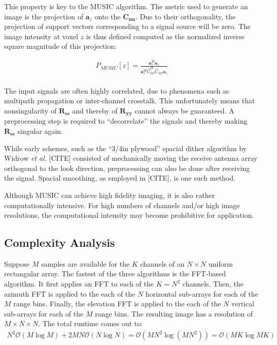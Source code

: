 This property is key to the MUSIC algorithm.
The metric used to generate an image is the projection of $\mathbf a_z$ onto the $\mathbf{C_{nn}}$.
Due to their orthogonality, the projection of support vectors corresponding to a signal source will be zero.
The image intensity at voxel $z$ is thus defined computed as the normalized inverse square magnitude of this projection:

\begin{align}
    P_{MUSIC}[z] = \frac{\mathbf{a}_z^H \mathbf{a}_z}{\mathbf{a}_z^H\hat C_{nn}^H\hat C_{nn}\mathbf{a}_z}
\end{align} \\

The input signals are often highly correlated, due to phenomena such as multipath propagation or inter-channel crosstalk.
This unfortunately means that nonsingularity of $\mathbf{R_{ss}}$ and thereby of  $\mathbf{R_{yy}}$ cannot always be guaranteed.
A preprocessing step is required to ``decorrelate'' the signals and thereby making $\mathbf{R_{ss}}$ singular again.

While early schemes, such as the ``3/4in plywood'' spacial dither algorithm by Widrow \textit{et al.} [CITE]
consisted of mechanically moving the receive antenna array orthogonal to the look direction,
preprocessing can also be done after receiving the signal. Spacial smoothing, as employed in [CITE], is one such method.

Although MUSIC can achieve high fidelity imaging,
it is also rather computationally intensive.
For high numbers of channels and/or high image resolutions,
the computational intensity may become prohibitive for application.

\subsection{Complexity Analysis}
\label{sec:complexity_analysis}
Suppose $M$ samples are available for the $K$ channels of an $N\times N$ uniform rectangular array.
The fastest of the three algorithms is the FFT-based algorithm.
It first applies an FFT to each of the $K=N^2$ channels.
Then, the azimuth FFT is applied to the each of the $N$ horizontal sub-arrays for each of the $M$ range bins.
Finally, the elevation FFT is applied to the each of the $N$ vertical sub-arrays for each of the $M$ range bins.
The resulting image has a resolution of $M \times N \times N$.
The total runtime comes out to:
\begin{align}
    N^2 \mathcal O(M \log M) + 2MN \mathcal O(N \log N) = \mathcal O \left(MN^2\log (MN^2) \right) = \mathcal O (MK \log MK)
\end{align}

